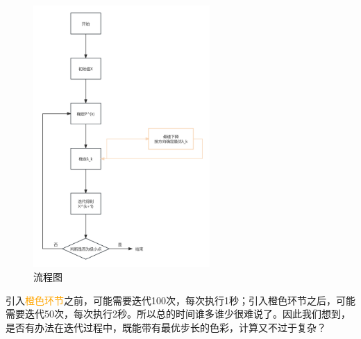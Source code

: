 \begin{figure}[H]
    \centering
    \includegraphics[width=0.6\textwidth]{./image/23.png}
    \caption{流程图}
    \label{fig:Chapter4_Temporary_Pavilion_1}
\end{figure}
引入\textcolor{orange}{橙色环节}之前，可能需要迭代100次，每次执行1秒；引入橙色环节之后，可能需要迭代50次，每次执行2秒。所以总的时间谁多谁少很难说了。因此我们想到，是否有办法在迭代过程中，既能带有最优步长的色彩，计算又不过于复杂？
